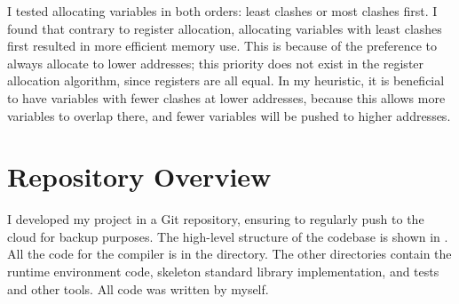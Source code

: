 \documentclass[00-main.tex]{subfiles}
\begin{document}
I tested allocating variables in both orders: least clashes or most clashes first.
I found that contrary to register allocation, allocating variables with least clashes first resulted in more efficient memory use.
This is because of the preference to always allocate to lower addresses; this priority does not exist in the register allocation algorithm, since registers are all equal.
In my heuristic, it is beneficial to have variables with fewer clashes at lower addresses, because this allows more variables to overlap there, and fewer variables will be pushed to higher addresses.



\FloatBarrier %

\vspace{-1ex} %
\section{Repository Overview}

I developed my project in a Git repository, ensuring to regularly push to the cloud for backup purposes.
The high-level structure of the codebase is shown in .
All the code for the compiler is in the  directory.
The other directories contain the runtime environment code, skeleton standard library implementation, and tests and other tools.
All code was written by myself.

\newlength\IndentWidth\setlength\IndentWidth{1em}
\end{document}
